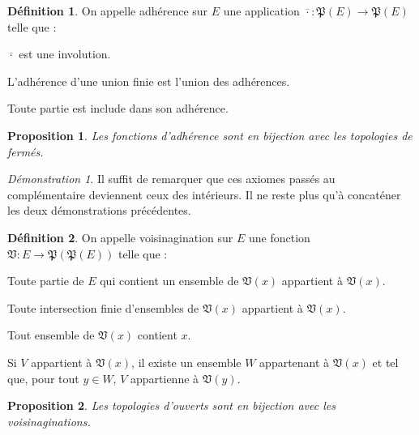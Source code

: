 \documentclass[a4paper, 11pt, french]{book}
\newenvironment{itemise}{\itemize}{\enditemize}
\theoremstyle{plain} %
\newtheorem{proposition}{Proposition}
\theoremstyle{definition} %
\newtheorem{definition}{Définition}
\theoremstyle{remark} %
\newtheorem*{demonstration}{Démonstration}
\newcommand{\1}{\mathds{1}}
\renewcommand{\frak}[1]{\mathfrak{#1}}
\begin{document}
\begin{definition}
	On appelle adhérence sur $E$ une application $\overline{\cdot}\colon\frak{P}(E)\rightarrow\frak{P}(E)$ telle que :
	\begin{itemise}
		\item $\overline{\cdot}$ est une involution.
		\item L'adhérence d'une union finie est l'union des adhérences.
		\item Toute partie est include dans son adhérence.
	\end{itemise}
\end{definition}

\begin{proposition}
	Les fonctions d'adhérence sont en bijection avec les topologies de fermés.
\end{proposition}

\begin{demonstration}
	Il suffit de remarquer que ces axiomes passés au complémentaire deviennent ceux des intérieurs.
	Il ne reste plus qu'à concaténer les deux démonstrations précédentes.
\end{demonstration}

\begin{definition}
	On appelle voisinagination sur $E$ une fonction $\frak{V}\colon E\rightarrow\frak{P}(\frak{P}(E))$ telle que :
	\begin{itemise}
		\item Toute partie de $E$ qui contient un ensemble de $\frak{V}(x)$ appartient à $\frak{V}(x)$.
		\item Toute intersection finie d'ensembles de $\frak{V}(x)$ appartient à $\frak{V}(x)$.
		\item Tout ensemble de $\frak{V}(x)$ contient $x$.
		\item Si $V$ appartient à $\frak{V}(x)$, il existe un ensemble $W$ appartenant à $\frak{V}(x)$ et tel que, pour tout $y\in W$, $V$ appartienne à $\frak{V}(y)$.
	\end{itemise}
\end{definition}

\begin{proposition}
	Les topologies d'ouverts sont en bijection avec les voisinaginations.
\end{proposition}
\end{document}
